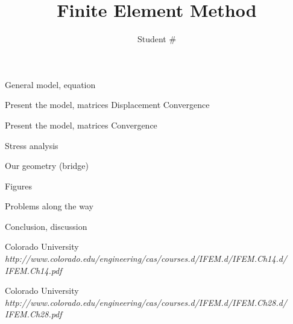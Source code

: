 \documentclass[9pt]{extarticle}
\title{Finite Element Method}
\author{Student \# }
\begin{document}
\maketitle



General model, equation




Present the model, matrices
Displacement
Convergence







Present the model, matrices
Convergence


Stress analysis



Our geometry (bridge)

Figures

Problems along the way


Conclusion, discussion



\begin{thebibliography}{2}

	Colorado University\\
	\emph{http://www.colorado.edu/engineering/cas/courses.d/IFEM.d/IFEM.Ch14.d/\\IFEM.Ch14.pdf}


	Colorado University\\
	\emph{http://www.colorado.edu/engineering/cas/courses.d/IFEM.d/IFEM.Ch28.d/\\IFEM.Ch28.pdf}	
\end{thebibliography}
\end{document}
